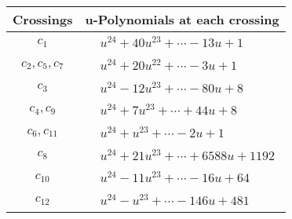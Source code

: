 \documentclass[1p]{elsarticle_modified}
\theoremstyle{definition}
\begin{document}
\begin{tabular}{m{50pt}|m{274pt}}
Crossings & \hspace{64pt}u-Polynomials at each crossing \\
\hline $$\begin{aligned}c_{1}\end{aligned}$$&$\begin{aligned}
&u^{24}+40 u^{23}+\cdots-13 u+1
\end{aligned}$\\
\hline $$\begin{aligned}c_{2},c_{5},c_{7}\end{aligned}$$&$\begin{aligned}
&u^{24}+20 u^{22}+\cdots-3 u+1
\end{aligned}$\\
\hline $$\begin{aligned}c_{3}\end{aligned}$$&$\begin{aligned}
&u^{24}-12 u^{23}+\cdots-80 u+8
\end{aligned}$\\
\hline $$\begin{aligned}c_{4},c_{9}\end{aligned}$$&$\begin{aligned}
&u^{24}+7 u^{23}+\cdots+44 u+8
\end{aligned}$\\
\hline $$\begin{aligned}c_{6},c_{11}\end{aligned}$$&$\begin{aligned}
&u^{24}+u^{23}+\cdots-2 u+1
\end{aligned}$\\
\hline $$\begin{aligned}c_{8}\end{aligned}$$&$\begin{aligned}
&u^{24}+21 u^{23}+\cdots+6588 u+1192
\end{aligned}$\\
\hline $$\begin{aligned}c_{10}\end{aligned}$$&$\begin{aligned}
&u^{24}-11 u^{23}+\cdots-16 u+64
\end{aligned}$\\
\hline $$\begin{aligned}c_{12}\end{aligned}$$&$\begin{aligned}
&u^{24}- u^{23}+\cdots-146 u+481
\end{aligned}$\\
\hline
\end{tabular}\\~\\
\end{document}
